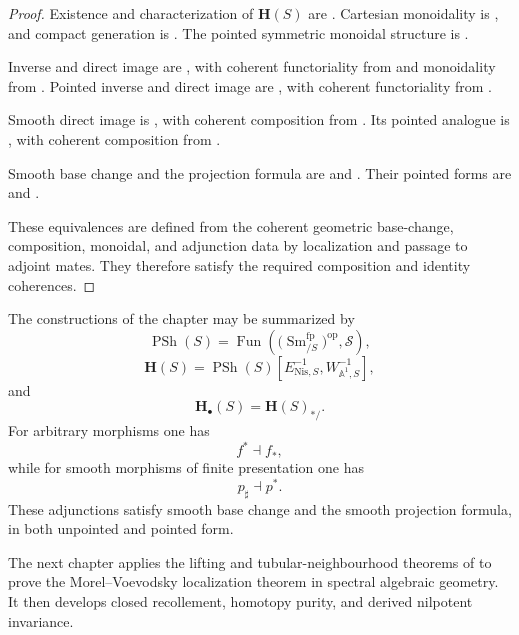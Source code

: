 \begin{proof}
Existence and characterization of \(\mathbf H(S)\) are
.  Cartesian monoidality is
, and compact
generation is
.  The pointed
symmetric monoidal structure is
.

Inverse and direct image are
, with coherent functoriality from
 and monoidality from
.  Pointed inverse and
direct image are
, with coherent functoriality from
.

Smooth direct image is
, with coherent composition from
.  Its pointed analogue is
, with coherent composition from
.

Smooth base change and the projection formula are
 and
.  Their pointed forms are
 and
.

These equivalences are defined from the coherent geometric
base-change, composition, monoidal, and adjunction data by localization
and passage to adjoint mates. They therefore satisfy the required
composition and identity coherences.
\end{proof}

The constructions of the chapter may be summarized by
\[
    \operatorname{PSh}(S)
    =
    \operatorname{Fun}
    \left(
        \bigl(
            \operatorname{Sm}^{\mathrm{fp}}_{/S}
        \bigr)^{\mathrm{op}},
        \mathcal S
    \right),
\]
\[
    \mathbf H(S)
    =
    \operatorname{PSh}(S)
    \left[
        E_{\mathrm{Nis},S}^{-1},
        W_{\mathbb A^1,S}^{-1}
    \right],
\]
and
\[
    \mathbf H_\bullet(S)
    =
    \mathbf H(S)_{*/}.
\]
For arbitrary morphisms one has
\[
    f^*
    \dashv
    f_*,
\]
while for smooth morphisms of finite presentation one has
\[
    p_\sharp
    \dashv
    p^*.
\]
These adjunctions satisfy smooth base change and the smooth projection
formula, in both unpointed and pointed form.

The next chapter applies the lifting and tubular-neighbourhood theorems
of
to prove the Morel--Voevodsky localization theorem in spectral algebraic
geometry.  It then develops closed recollement, homotopy purity, and
derived nilpotent invariance.
